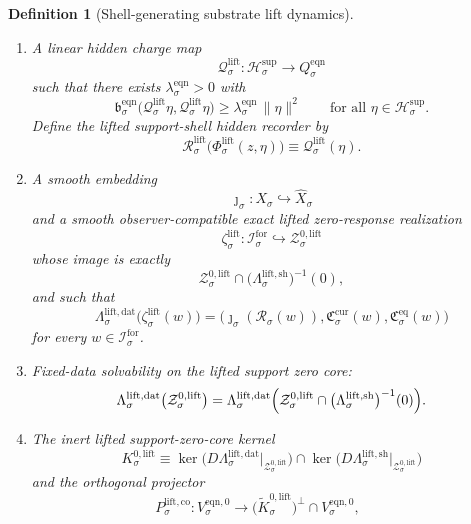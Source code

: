 \documentclass[11pt]{article}
\newcommand{\ForSpace}[1]{\mathcal I_{#1}^{\mathrm{for}}}
\newcommand{\Reduction}[1]{\mathcal R_{#1}}
\newcommand{\CurrentCarrier}[1]{\mathfrak C_{#1}^{\mathrm{cur}}}
\newcommand{\EqCarrier}[1]{\mathfrak C_{#1}^{\mathrm{eq}}}
\newcommand{\VisibleAffine}[1]{\widehat X_{#1}}
\newcommand{\EqnTarget}[1]{Q_{#1}^{\mathrm{eqn}}}
\newcommand{\EqnPair}[1]{\mathfrak b_{#1}^{\mathrm{eqn}}}
\newcommand{\EqnZero}[1]{V_{#1}^{\mathrm{eqn},0}}
\newcommand{\SeedHidden}[1]{\mathcal H_{#1}^{\mathrm{sup}}}
\newcommand{\LiftData}[1]{\Lambda_{#1}^{\mathrm{lift,dat}}}
\newcommand{\LiftShellMap}[1]{\Lambda_{#1}^{\mathrm{lift,sh}}}
\newcommand{\LiftZeroCore}[1]{\mathcal Z_{#1}^{0,\mathrm{lift}}}
\newcommand{\LiftSplit}[1]{\Phi_{#1}^{\mathrm{lift}}}
\newcommand{\LiftCharge}[1]{\mathcal Q_{#1}^{\mathrm{lift}}}
\newcommand{\LiftResidual}[1]{\mathcal R_{#1}^{\mathrm{lift}}}
\newcommand{\LiftEmbed}[1]{\zeta_{#1}^{\mathrm{lift}}}
\newcommand{\LiftKernel}[1]{K_{#1}^{0,\mathrm{lift}}}
\newcommand{\LiftKernelCh}[1]{\widetilde K_{#1}^{0,\mathrm{lift}}}
\newcommand{\LiftStateComp}[1]{P_{#1}^{\mathrm{lift,co}}}
\newtheorem{definition}{Definition}
\begin{document}
\begin{definition}[Shell-generating substrate lift dynamics]
\begin{enumerate}
    \item A linear hidden charge map
    \[
    \LiftCharge{\sigma}:\SeedHidden{\sigma}\to\EqnTarget{\sigma}
    \]
    such that there exists \(\lambda_{\sigma}^{\mathrm{eqn}}>0\) with
    \begin{equation}
    \EqnPair{\sigma}\bigl(\LiftCharge{\sigma}\eta,\LiftCharge{\sigma}\eta\bigr)
    \ge
    \lambda_{\sigma}^{\mathrm{eqn}}\,
    \|\eta\|^{2}
    \qquad
    \text{for all }\eta\in\SeedHidden{\sigma}.
    \label{eq:liftchargegap}
    \end{equation}
    Define the lifted support-shell hidden recorder by
    \begin{equation}
    \LiftResidual{\sigma}\bigl(\LiftSplit{\sigma}(z,\eta)\bigr)
    \equiv
    \LiftCharge{\sigma}(\eta).
    \label{eq:liftresidual}
    \end{equation}
    \item A smooth embedding
    \[
    \jmath_{\sigma}:X_{\sigma}\hookrightarrow\VisibleAffine{\sigma}
    \]
    and a smooth observer-compatible exact lifted zero-response realization
    \[
    \LiftEmbed{\sigma}:\ForSpace{\sigma}\hookrightarrow\LiftZeroCore{\sigma}
    \]
    whose image is exactly
    \[
    \LiftZeroCore{\sigma}
    \cap
    \bigl(\LiftShellMap{\sigma}\bigr)^{-1}(0),
    \]
    and such that
    \begin{equation}
    \LiftData{\sigma}\bigl(\LiftEmbed{\sigma}(w)\bigr)
    =
    \bigl(
    \jmath_{\sigma}(\Reduction{\sigma}(w)),
    \CurrentCarrier{\sigma}(w),
    \EqCarrier{\sigma}(w)
    \bigr)
    \label{eq:liftcompat}
    \end{equation}
    for every \(w\in\ForSpace{\sigma}\).
    \item Fixed-data solvability on the lifted support zero core:
    \begin{equation}
    \LiftData{\sigma}\bigl(\LiftZeroCore{\sigma}\bigr)
    =
    \LiftData{\sigma}\Bigl(
    \LiftZeroCore{\sigma}\cap
    \bigl(\LiftShellMap{\sigma}\bigr)^{-1}(0)
    \Bigr).
    \label{eq:liftsolvability}
    \end{equation}
    \item The inert lifted support-zero-core kernel
    \[
    \LiftKernel{\sigma}
    \equiv
    \ker\bigl(D\LiftData{\sigma}\big|_{\LiftZeroCore{\sigma}}\bigr)
    \cap
    \ker\bigl(D\LiftShellMap{\sigma}\big|_{\LiftZeroCore{\sigma}}\bigr)
    \]
    and the orthogonal projector
    \[
    \LiftStateComp{\sigma}:
    \EqnZero{\sigma}\to
    \bigl(\LiftKernelCh{\sigma}\bigr)^{\perp}\cap\EqnZero{\sigma},
    \qquad
\]
\end{enumerate}
\end{definition}
\end{document}
